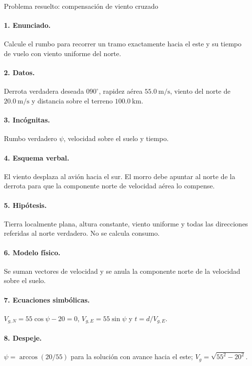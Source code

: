 \begin{studiumworked}{Problema resuelto: compensación de viento cruzado}

\paragraph{1. Enunciado.} Calcule el rumbo para recorrer un tramo exactamente hacia el este y su tiempo de vuelo con viento uniforme del norte.
\paragraph{2. Datos.} Derrota verdadera deseada $090^\circ$, rapidez aérea $55.0\ \mathrm{m/s}$, viento del norte de $20.0\ \mathrm{m/s}$ y distancia sobre el terreno $100.0\ \mathrm{km}$.
\paragraph{3. Incógnitas.} Rumbo verdadero $\psi$, velocidad sobre el suelo y tiempo.
\paragraph{4. Esquema verbal.} El viento desplaza al avión hacia el sur. El morro debe apuntar al norte de la derrota para que la componente norte de velocidad aérea lo compense.
\paragraph{5. Hipótesis.} Tierra localmente plana, altura constante, viento uniforme y todas las direcciones referidas al norte verdadero. No se calcula consumo.
\paragraph{6. Modelo físico.} Se suman vectores de velocidad y se anula la componente norte de la velocidad sobre el suelo.
\paragraph{7. Ecuaciones simbólicas.} $V_{g,N}=55\cos\psi-20=0$, $V_{g,E}=55\sin\psi$ y $t=d/V_{g,E}$.
\paragraph{8. Despeje.} $\psi=\arccos(20/55)$ para la solución con avance hacia el este; $V_g=\sqrt{55^2-20^2}$.

\end{studiumworked}
